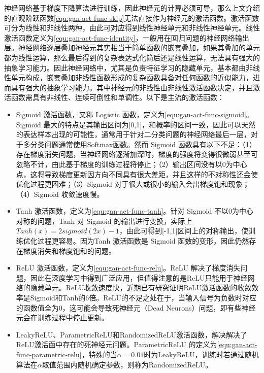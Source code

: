 神经网络基于梯度下降算法进行训练，因此神经元的计算必须可导，那么上文介绍的直观阶跃函数\ref{equ:gan-act-func-skip}无法直接作为神经元的激活函数。激活函数可分为线性和非线性两种，由此可对应得到线性神经单元和非线性神经单元。线性激活函数定义为\ref{equ:gan-act-func-identity}，一般用在回归问题的神经网络输出层。神经网络逐层叠加神经元其实相当于简单函数的嵌套叠加，如果其叠加的单元都为线性运算，那么最后得到的复杂表达式化简后还是线性运算，无法具有强大的抽象学习能力。因此神经网络中，尤其是负责特征学习的隐藏单元，基本都由非线性单元构成，嵌套叠加非线性函数形成的复杂函数具备对任何函数的近似能力，进而具有强大的抽象学习能力。其中神经元的非线性由非线性激活函数决定，并且激活函数需具有非线性、连续可倒性和单调性。以下是主流的激活函数：
\begin{itemize}
  \item Sigmoid 激活函数，又称 Logistic 函数，定义为\ref{equ:gan-act-func-sigmoid}。Sigmoid 最大的特点是其输出区间为[0,1]，和概率的区间一致，因此可以天然的表达样本出现的可能性，通常用于针对二分类问题的神经网络最后一层，对于多分类问题通常使用Softmax函数。然而 Sigmoid 函数具有以下不足：（1）存在梯度消失问题，当神经网络逐渐加深时，梯度的强度将变得很微弱甚至可忽略不计，由此基于梯度的训练过程将停止；（2）输出区间没有以0为中心点，这将导致梯度更新因方向不同具有很大差距，并且这样的不对称性还会使优化过程更困难；（3）Sigmoid 对于很大或很小的输入会出梯度饱和现象；（4）Sigmoid 收敛速度慢。
  \item Tanh 激活函数，定义为\ref{equ:gan-act-func-tanh}。针对 Sigmoid 不以0为中心对称的问题，Tanh 对 Sigmoid 的输出进行变换，实际上$Tanh(x) = 2sigmoid(2x)-1$，由此可得到[-1,1]区间上的对称输出，使训练优化过程更容易。因为Tanh 激活函数是 Sigmoid 函数的变形，因此仍然存在梯度消失和梯度饱和的问题。
  \item ReLU 激活函数，定义为\ref{equ:gan-act-func-relu}。ReLU 解决了梯度消失问题，因此在深度学习中得到广泛应用，但值得注意的是ReLU只能用于神经网络的隐藏单元。ReLU收敛速度快，近期已有研究证明ReLU激活函数的收敛效率是Sigmoid和Tanh的6倍。ReLU的不足之处在于，当输入信号为负数时对应的函数值全为0，这可能会导致死神经元（Dead Neurons）问题，即有些神经元会在训练过程中停止更新。
  \item LeakyReLU、ParametricReLU和RandomizedReLU激活函数，解决解决了ReLU激活函中存在的死神经元问题。ParametricReLU 的定义为\ref{equ:gan-act-func-parametric-relu}，特殊的当$\alpha = 0.01$时为LeakyReLU，训练时若通过随机算法在$\alpha$取值范围内随机确定参数，则称为RandomizedReLU。
\end{itemize}

